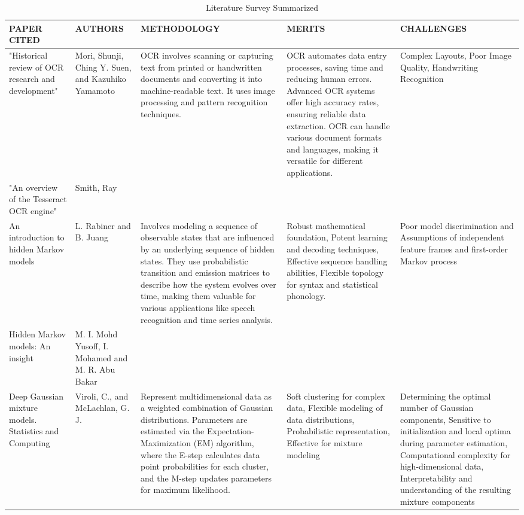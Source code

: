 \documentclass[conference]{IEEEtran}
\begin{document}
\baselineskip
\begin{table}
 \caption{Literature Survey Summarized}
\begin{center}
 \centering
    \begin{tabular}{ |p{2cm}|p{2cm}|p{4cm}|p{3cm}|p{4cm}| }
\hline
\centering PAPER CITED & \centering  AUTHORS & \centering METHODOLOGY &  \centering MERITS &  \centering CHALLENGES \arraybackslash \\ 
\hline
[5] "Historical review of OCR research and development" &  Mori, Shunji, Ching Y. Suen, and Kazuhiko Yamamoto &  OCR involves scanning or capturing text from printed or handwritten documents and converting it into machine-readable text. It uses image processing and pattern recognition techniques. &  OCR automates data entry processes, saving time and reducing human errors. Advanced OCR systems offer high accuracy rates, ensuring reliable data extraction. OCR can handle various document formats and languages, making it versatile for different applications. &  Complex Layouts, Poor Image Quality, Handwriting Recognition  \\
\hline
[6] "An overview of the Tesseract OCR engine"  &  Smith, Ray &  &  &    \\
\hline
[7] An introduction to hidden Markov models &  L. Rabiner and B. Juang &  Involves modeling a sequence of observable states that are influenced by an underlying sequence of hidden states. They use probabilistic transition and emission matrices to describe how the system evolves over time, making them valuable for various applications like speech recognition and time series analysis. & Robust mathematical foundation, Potent learning and decoding techniques, Effective sequence handling abilities, Flexible topology for syntax and statistical phonology. &  Poor model discrimination and Assumptions of independent feature frames and first-order Markov process  \\
\hline
[8] Hidden Markov models: An insight &  M. I. Mohd Yusoff, I. Mohamed and M. R. Abu Bakar & & &   \\
\hline
[9] Deep Gaussian mixture models. Statistics and Computing &  Viroli, C., and McLachlan, G. J. & Represent multidimensional data as a weighted combination of Gaussian distributions. Parameters are estimated via the Expectation-Maximization (EM) algorithm, where the E-step calculates data point probabilities for each cluster, and the M-step updates parameters for maximum likelihood. &  Soft clustering for complex data, Flexible modeling of data distributions, Probabilistic representation, Effective for mixture modeling &  Determining the optimal number of Gaussian components, Sensitive to initialization and local optima during parameter estimation, Computational complexity for high-dimensional data, Interpretability and understanding of the resulting mixture components \\

\end{tabular}
\end{center}
\end{table}
\end{document}

